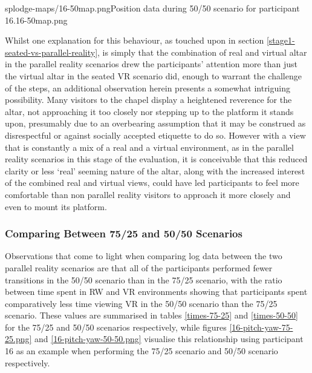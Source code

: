        {splodge-maps/16-50map.png}{Position data during 50/50 scenario for participant 16.}{16-50map.png}

\newpage

Whilst one explanation for this behaviour, as touched upon in section \ref{stage1-seated-vs-parallel-reality}, is simply that the combination of real and virtual altar in the parallel reality scenarios drew the participants' attention more than just the virtual altar in the seated VR scenario did, enough to warrant the challenge of the steps, an additional observation herein presents a somewhat intriguing possibility. Many visitors to the chapel display a heightened reverence for the altar, not approaching it too closely nor stepping up to the platform it stands upon, presumably due to an overbearing assumption that it may be construed as disrespectful or against socially accepted etiquette to do so. However with a view that is constantly a mix of a real and a virtual environment, as in the parallel reality scenarios in this stage of the evaluation, it is conceivable that this reduced clarity or less `real' seeming nature of the altar, along with the increased interest of the combined real and virtual views, could have led participants to feel more comfortable than non parallel reality visitors to approach it more closely and even to mount its platform.


\newpage

\subsubsection{Comparing Between 75/25 and 50/50 Scenarios}

Observations that come to light when comparing log data between the two parallel reality scenarios are that all of the participants performed fewer transitions in the 50/50 scenario than in the 75/25 scenario, with the ratio between time spent in RW and VR environments showing that participants spent comparatively less time viewing VR in the 50/50 scenario than the 75/25 scenario. These values are summarised in tables \ref{times-75-25} and \ref{times-50-50} for the 75/25 and 50/50 scenarios respectively, while figures \ref{16-pitch-yaw-75-25.png} and \ref{16-pitch-yaw-50-50.png} visualise this relationship using participant 16 as an example when performing the 75/25 scenario and 50/50 scenario respectively.

